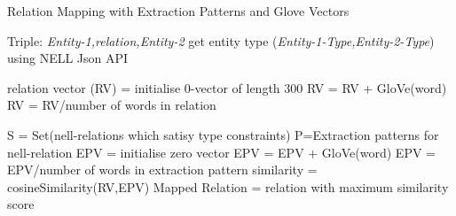 \begin{algorithm}

\caption{Relation Mapping with Extraction Patterns and Glove Vectors}

\label{alg:RMalgorithm}

\begin{algorithmic}[1]


\State Triple: \textit{Entity-1,relation,Entity-2}
\State get entity type (\textit{Entity-1-Type,Entity-2-Type}) using NELL Json API

\State relation vector (RV) = initialise 0-vector of length 300
\State RV = RV + GloVe(word)
\EndFor
\State RV = RV/number of words in relation

\State S = Set(nell-relations which satisy type constraints)
\State P=Extraction patterns for nell-relation
\State EPV = initialise zero vector
\State EPV = EPV + GloVe(word)
\EndFor
\State EPV = EPV/number of words in extraction pattern
\EndFor
\State similarity = cosineSimilarity(RV,EPV)
\EndFor
\State Mapped Relation = relation with maximum similarity score
\EndProcedure
\end{algorithmic}

\end{algorithm}

